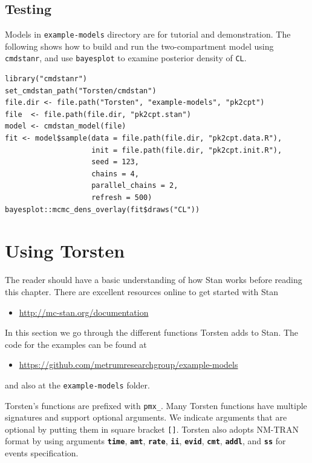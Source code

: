 \documentclass[11pt, reqno, oneside]{amsbook}
\numberwithin{equation}{chapter}
\numberwithin{figure}{chapter}
\numberwithin{table}{chapter}
\theoremstyle{remark}
\begin{document}
\section{Testing}
\label{sec:org5cf7c3c}
Models in \texttt{example-models} directory are for tutorial and demonstration.
The following shows how to build and run the two-compartment model
using \texttt{cmdstanr}, and use \texttt{bayesplot} to examine posterior density of \texttt{CL}.
\begin{verbatim}
library("cmdstanr")
set_cmdstan_path("Torsten/cmdstan")
file.dir <- file.path("Torsten", "example-models", "pk2cpt")
file  <- file.path(file.dir, "pk2cpt.stan")
model <- cmdstan_model(file)
fit <- model$sample(data = file.path(file.dir, "pk2cpt.data.R"),
                    init = file.path(file.dir, "pk2cpt.init.R"),
                    seed = 123,
                    chains = 4,
                    parallel_chains = 2,
                    refresh = 500)
bayesplot::mcmc_dens_overlay(fit$draws("CL"))
\end{verbatim}

\chapter{Using Torsten}
\label{sec:org3038322}
The reader should have a basic understanding of how Stan works before
reading this chapter. There are excellent resources online to get
started with Stan
\begin{itemize}
\item \href{http://mc-stan.org/documentation}{http://mc-stan.org/documentation}
\end{itemize}

In this section we go through the different functions Torsten adds to
Stan. The code for the examples can be found at
\begin{itemize}
\item \href{https://github.com/metrumresearchgroup/example-models}{https://github.com/metrumresearchgroup/example-models}
\end{itemize}

and also at the \texttt{example-models} folder. 

Torsten's functions are prefixed with \texttt{pmx\_}. Many Torsten functions
have multiple signatures and support optional arguments. 
We indicate arguments that are optional by putting them in square bracket \texttt{[]}.
Torsten also adopts NM-TRAN format by using arguments {\small \color{MRGGreen} \texttt{\textbf{time}}}, {\small \color{MRGGreen} \texttt{\textbf{amt}}}, {\small \color{MRGGreen} \texttt{\textbf{rate}}}, {\small \color{MRGGreen} \texttt{\textbf{ii}}}, {\small \color{MRGGreen} \texttt{\textbf{evid}}}, {\small \color{MRGGreen} \texttt{\textbf{cmt}}}, {\small \color{MRGGreen} \texttt{\textbf{addl}}}, and
 {\small \color{MRGGreen} \texttt{\textbf{ss}}} for events specification.
\end{document}
